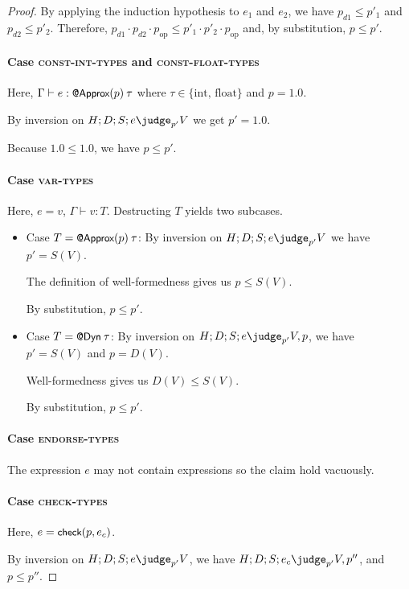 {\begin{proof}
By applying the induction hypothesis to $e_1$ and $e_2$, we have
$p_{d1} \le p'_1$ and $p_{d2} \le p'_2$.
Therefore,
$p_{d1} \cdot p_{d2} \cdot p_\text{op} \le p'_1 \cdot p'_2 \cdot p_\text{op}$
and, by substitution, $p \le p'$.

\paragraph{Case \textsc{const-int-types} and \textsc{const-float-types}}
Here,
$\Gamma \vdash e : \text{\normalfont{\sffamily\small{@Approx}}}(p) \> \tau$
where
$\tau \in \{\text{int, float}\}$
and
$p = 1.0$.

By inversion on $H ; D ; S ; e \pjudge{p'} V$ we get $p' = 1.0$.

Because $1.0 \le 1.0$, we have $p \le p'$.

\paragraph{Case \textsc{var-types}}
Here, $e = v$, $\Gamma \vdash v : T$.
Destructing $T$ yields two subcases.
    \begin{itemize}
    \item Case $T = \text{\normalfont{\sffamily\small{@Approx}}}(p) \> \tau$:
    By inversion on $H ; D ; S ; e \pjudge{p'} V$ we have $p' = S(V)$.

    The definition of well-formedness gives us $p \le S(V)$.

    By substitution, $p \le p'$.

    \item Case $T = \text{\normalfont{\sffamily\small{@Dyn}}} \> \tau$:
    By inversion on $H ; D ; S ; e \pjudge{p'} V, p$, we have $p' = S(V)$ and
    $p = D(V)$.

    Well-formedness gives us $D(V) \le S(V)$.

    By substitution, $p \le p'$.
    \end{itemize}

\paragraph{Case \textsc{endorse-types}}
The expression
$e$ may not contain  expressions so the claim hold vacuously.

\paragraph{Case \textsc{check-types}}
Here, $e = \text{\normalfont{\sffamily\small{check}}}(p, e_c)$.

By inversion on $H ; D ; S ; e \pjudge{p'} V$, we have
$H ; D ; S ; e_c \pjudge{p'} V, p''$, and
$p \le p''$.


\end{proof}}
